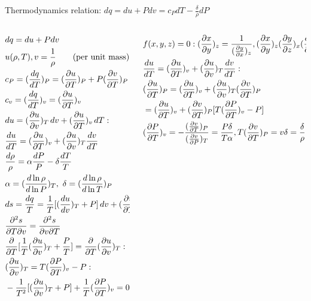 \begin{frame}{Thermodynamics relation: $dq=du+Pdv=c_PdT-\frac{\delta}{\rho}dP$}
    \begin{columns}[T]
        \begin{column}{0.45\textwidth}
            \begin{align*}
                &dq=du+Pdv\\
                &u(\rho,T),v=\frac{1}{\rho}\tag{per unit mass}\\
                &c_P=(\TDy{T}{q})_P=(\PDy{T}{u})_P+P(\PDy{T}{v})_P\\
                &c_v=(\TDy{T}{q})_v=(\PDy{T}{u})_v\\
                &du=(\PDy{v}{u})_T\,dv+(\PDy{T}{u})_v\,dT:\\
                &\TDy{T}{u}=(\PDy{T}{u})_v+(\PDy{v}{u})_T\TDy{T}{v}\\
                &\frac{d\rho}{\rho}=\alpha \frac{dP}{P}-\delta \frac{dT}{T}\\
                &\alpha=(\TDly{P}{\rho})_T,\ \delta=(\TDly{T}{\rho})_P\\
                &ds=\frac{dq}{T}=\frac{1}{T}[(\TDy{v}{u})_T+P]\,dv+(\PDy{T}{u})_v\,dT:\\
                &\frac{\partial^2s}{\partial T\partial v}=\frac{\partial^2s}{\partial v\partial T}\\
                &\PDof{T}[\frac{1}{T}(\PDy{v}{u})_T+\frac{P}{T}]=\PDof{T}(\PDy{v}{u})_T:\\
                &(\PDy{v}{u})_T=T(\PDy{T}{P})_v-P:\\
                &-\frac{1}{T^2}[(\PDy{v}{u})_T+P]+\frac{1}{T}(\PDy{T}{P})_v=0
            \end{align*}
        \end{column}
        \begin{column}{0.55\textwidth}
            \begin{align*}
                &f(x,y,z)=0: (\PDy{y}{x})_z=\frac{1}{(\PDy{x}{y})_z}, (\PDy{y}{x})_z(\PDy{z}{y})_x(\PDy{x}{z})_y=-1\\
                &\TDy{T}{u}=(\PDy{T}{u})_v+(\PDy{v}{u})_T\TDy{T}{v}:\\
                &(\PDy{T}{u})_P=(\PDy{T}{u})_v+(\PDy{v}{u})_T(\PDy{T}{v})_P\\
                &=(\PDy{T}{u})_v+(\PDy{T}{v})_P[T(\PDy{T}{P})_v-P]\\
                &(\PDy{T}{P})_v=-\frac{(\PDy{T}{v})_P}{(\PDy{P}{v})_T}=\frac{P\delta}{T\alpha}, T(\PDy{T}{v})_P=v\delta=\frac{\delta}{\rho}\\

\end{align*}
\end{column}
\end{columns}
\end{frame}
